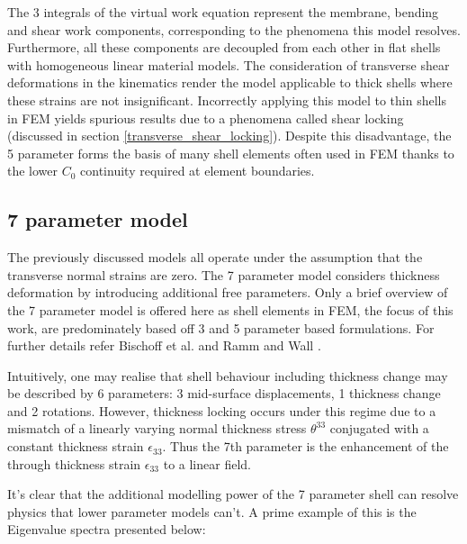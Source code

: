 The 3 integrals of the virtual work equation represent the membrane, bending and shear work components, corresponding to the phenomena this model resolves. Furthermore, all these components are decoupled from each other in flat shells with homogeneous linear material models. The consideration of transverse shear deformations in the kinematics render the model applicable to thick shells where these strains are not insignificant. Incorrectly applying this model to thin shells in FEM yields spurious results due to a phenomena called shear locking (discussed in section \ref{transverse_shear_locking}). Despite this disadvantage, the 5 parameter forms the basis of many shell elements often used in FEM thanks to the lower $C_0$ continuity required at element boundaries.

\subsection{7 parameter model}

The previously discussed models all operate under the assumption that the transverse normal strains are zero. The 7 parameter model considers thickness deformation by introducing additional free parameters. Only a brief overview of the 7 parameter model is offered here as shell elements in FEM, the focus of this work, are predominately based off 3 and 5 parameter based formulations. For further details refer Bischoff et al. \cite{BischLitBook04} and Ramm and Wall \cite{RammLitBook04}.

Intuitively, one may realise that shell behaviour including thickness change may be described by 6 parameters:  3 mid-surface displacements, 1 thickness change and 2 rotations.  However, thickness locking occurs under this regime due to a mismatch of a linearly varying normal thickness stress $\theta^{33}$ conjugated with a constant thickness strain $\epsilon_{33}$. Thus the 7th parameter is the enhancement of the through thickness strain $\epsilon_{33}$ to a linear field.

It's clear that the additional modelling power of the 7 parameter shell can resolve physics that lower parameter models can't. A prime example of this is the Eigenvalue spectra presented below:

